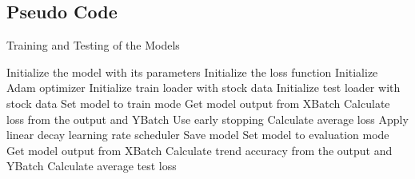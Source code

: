 \subsection{Pseudo Code}
\begin{algorithm}[H]
\caption{Training and Testing of the Models}
\begin{algorithmic}[1]
\STATE Initialize the model with its parameters
\STATE Initialize the loss function
\STATE Initialize Adam optimizer
\STATE Initialize train loader with stock data
\STATE Initialize test loader with stock data
\STATE Set model to train mode
\STATE Get model output from X\textunderscore Batch
\STATE Calculate loss from the output and Y\textunderscore Batch
\STATE Use early stopping
\ENDFOR
\STATE Calculate average loss
\STATE Apply linear decay learning rate scheduler
\ENDFOR
\ENDFOR
\STATE Save model
\STATE Set model to evaluation mode
\STATE Get model output from X\textunderscore Batch
\STATE Calculate trend accuracy from the output and Y\textunderscore Batch
\ENDFOR
\STATE Calculate average test loss

\end{algorithmic}
\end{algorithm}